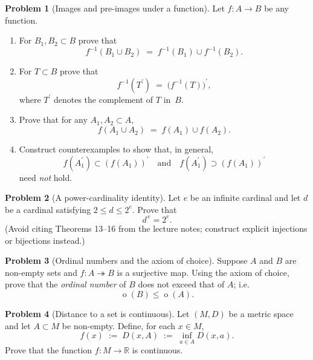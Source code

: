 \documentclass[12pt]{article}
\theoremstyle{definition} %
\newtheorem{problem}{Problem}
\theoremstyle{plain} %
\begin{document}
\begin{problem}[Images and pre-images under a function]
  Let $f:A\to B$ be any function.
  \begin{enumerate}[label=(\alph*)]
    \item For $B_{1},B_{2}\subset B$ prove that
          \[
              f^{-1}(B_{1}\cup B_{2})
              \;=\;
              f^{-1}(B_{1})\cup f^{-1}(B_{2}).
          \]
    \item For $T\subset B$ prove that
          \[
              f^{-1}(T^{\prime})
              \;=\;
              \bigl(f^{-1}(T)\bigr)^{\prime},
          \]
          where $T^{\prime}$ denotes the complement of $T$ in~$B$.
    \item Prove that for any $A_{1},A_{2}\subset A$,
          \[
              f(A_{1}\cup A_{2})
              \;=\;
              f(A_{1})\cup f(A_{2}).
          \]
    \item Construct counterexamples to show that, in general,
          \[
              f(A_{1}^{\prime})\subset (f(A_{1}))^{\prime}
              \quad\text{and}\quad
              f(A_{1}^{\prime})\supset (f(A_{1}))^{\prime}
          \]
          need \emph{not} hold.
  \end{enumerate}
\end{problem}

\begin{problem}[A power-cardinality identity]
  Let $e$ be an infinite cardinal and let
  $d$ be a cardinal satisfying $2\le d\le 2^{e}$.
  Prove that
  \[
      d^{\,e}=2^{e}.
  \]
  (Avoid citing Theorems 13–16 from the lecture notes;
  construct explicit injections or bijections instead.)
\end{problem}

\begin{problem}[Ordinal numbers and the axiom of choice]
  Suppose $A$ and $B$ are non-empty sets and
  $f:A\twoheadrightarrow B$ is a surjective map.
  Using the axiom of choice, prove that
  the \emph{ordinal number} of $B$ does not exceed that of $A$; i.e.
  \[
      \operatorname{o}(B)\le\operatorname{o}(A).
  \]
\end{problem}

\begin{problem}[Distance to a set is continuous]
  Let $(M,D)$ be a metric space and let $A\subset M$ be non-empty.
  Define, for each $x\in M$,
  \[
      f(x)
      \;:=\;
      D(x,A)
      \;:=\;
      \inf_{a\in A}D(x,a).
  \]
  Prove that the function $f:M\to\mathbb{R}$ is continuous.
\end{problem}
\end{document}
